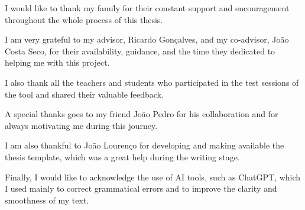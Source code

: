 
%

\begin{ntacknowledgements}

I would like to thank my family for their constant support and encouragement throughout the whole process of this thesis.

I am very grateful to my advisor, Ricardo Gonçalves, and my co-advisor, João Costa Seco, for their availability, guidance, and the time they dedicated to helping me with this project.

I also thank all the teachers and students who participated in the test sessions of the tool and shared their valuable feedback.

A special thanks goes to my friend João Pedro for his collaboration and for always motivating me during this journey.

I am also thankful to João Lourenço for developing and making available the thesis template, which was a great help during the writing stage.

Finally, I would like to acknowledge the use of AI tools, such as ChatGPT, which I used mainly to correct grammatical errors and to improve the clarity and smoothness of my text.
\end{ntacknowledgements}